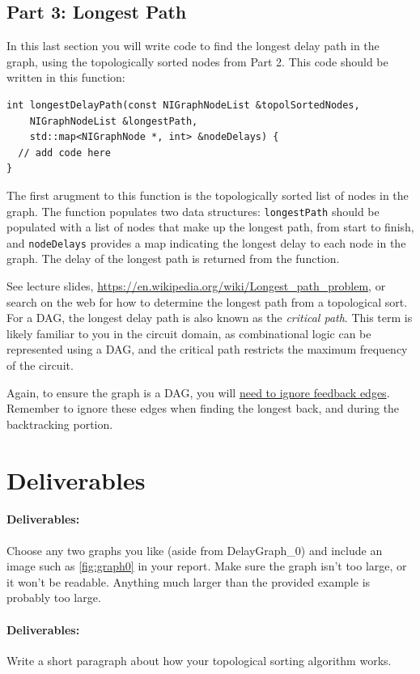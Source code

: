 \subsection{Part 3: Longest Path}
\label{sec:del3}
In this last section you will write code to find the longest delay path in the graph, using the topologically sorted nodes from Part 2.  This code should be written in this function:
\begin{lstlisting}
int longestDelayPath(const NIGraphNodeList &topolSortedNodes,
    NIGraphNodeList &longestPath,
    std::map<NIGraphNode *, int> &nodeDelays) {
  // add code here
}
\end{lstlisting}
The first arugment to this function is the topologically sorted list of nodes in the graph.  The function populates two data structures: \texttt{longestPath} should be populated with a list of nodes that make up the longest path, from start to finish, and \texttt{nodeDelays} provides a map indicating the longest delay to each node in the graph.  The delay of the longest path is returned from the function.

See lecture slides, \url{https://en.wikipedia.org/wiki/Longest_path_problem}, or search on the web for how to determine the longest path from a topological sort. For a DAG, the longest delay path is also known as the \emph{critical path}.  This term is likely familiar to you in the circuit domain, as combinational logic can be represented using a DAG, and the critical path restricts the maximum frequency of the circuit.  

Again, to ensure the graph is a DAG, you will \uline{need to ignore feedback edges}. Remember to ignore these edges when finding the longest back, and during the backtracking portion.


\section{Deliverables}

\paragraph{Deliverables:} Choose any two graphs you like (aside from DelayGraph\_0) and include an image such as \cref{fig:graph0} in your report.  Make sure the graph isn't too large, or it won't be readable.  Anything much larger than the provided example is probably too large.  



\paragraph{Deliverables:} Write a short paragraph about how your topological sorting algorithm works.  

